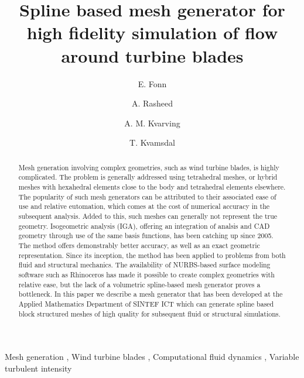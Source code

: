 \documentclass[3p,times,procedia]{elsarticle}
\begin{document}
\begin{frontmatter}

\title{Spline based mesh generator for high fidelity simulation of flow around turbine blades}

\author[a]{E. Fonn }
\author[a]{A. Rasheed}
\author[a]{A. M. Kvarving}
\author[a,b]{T. Kvamsdal}
\address[a]{Applied Mathematics, SINTEF ICT, Trondheim 7035, Norway}
\address[b]{Mathematical Sciences, Alfred Getz vei 1, Trondheim 7091, Norway}

\begin{abstract}
  Mesh generation involving complex geometries, such as wind turbine blades, is
  highly complicated. The problem is generally addressed using tetrahedral meshes,
  or hybrid meshes with hexahedral elements close to the body and tetrahedral
  elements elsewhere. The popularity of such mesh generators can be attributed to
  their associated ease of use and relative eutomation, which comes at the cost of
  numerical accuracy in the subsequent analysis. Added to this, such meshes can
  generally not represent the true geometry. Isogeometric analysis (IGA), offering
  an integration of analsis and CAD geometry through use of the same basis
  functions, has been catching up since 2005. The method offers demonstrably
  better accuracy, as well as an exact geometric representation. Since its
  inception, the method has been applied to problems from both fluid and
  structural mechanics. The availability of NURBS-based surface modeling software
  such as Rhinoceros has made it possible to create complex geometries with
  relative ease, but the lack of a volumetric spline-based mesh generator proves a
  bottleneck. In this paper we describe a mesh generator that has been developed
  at the Applied Mathematics Department of SINTEF ICT which can generate spline
  based block structured meshes of high quality for subsequent fluid or
  structural simulations.
\end{abstract}

\begin{keyword}
  Mesh generation \sep
  Wind turbine blades \sep
  Computational fluid dynamics \sep
  Variable turbulent intensity
\end{keyword}


\end{frontmatter}

\end{document}

